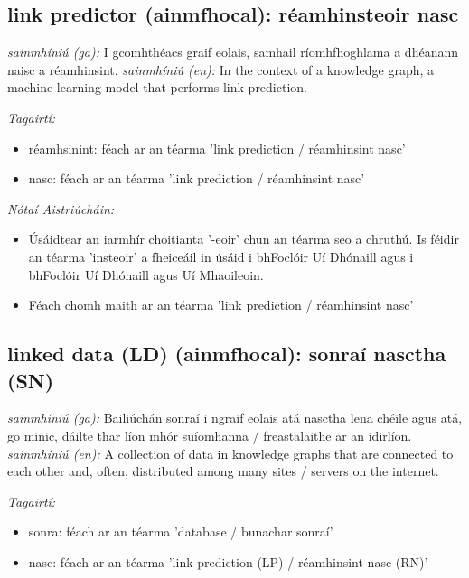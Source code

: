 \documentclass{article}
\begin{document}
\subsection*{link predictor (ainmfhocal): réamhinsteoir nasc} 
 \noindent \textit{sainmhíniú (ga):} I gcomhthéacs graif eolais, samhail ríomhfhoghlama a dhéanann naisc a réamhinsint.
\newline\newline
 \noindent \textit{sainmhíniú (en):} In the context of a knowledge graph, a machine learning model that performs link prediction.
\newline

 \noindent \textit{Tagairtí:}
\begin{itemize}
	\item réamhsinint: féach ar an téarma 'link prediction / réamhinsint nasc'
	\item nasc: féach ar an téarma 'link prediction / réamhinsint nasc'
\end{itemize}

 \noindent \textit{Nótaí Aistriúcháin:}
\begin{itemize}
	\item Úsáidtear an iarmhír choitianta '-eoir' chun an téarma seo a chruthú. Is féidir an téarma 'insteoir' a fheiceáil in úsáid i bhFoclóir Uí Dhónaill agus i bhFoclóir Uí Dhónaill agus Uí Mhaoileoin.
	\item Féach chomh maith ar an téarma 'link prediction / réamhinsint nasc'
\end{itemize}


\subsection*{linked data (LD) (ainmfhocal): sonraí nasctha (SN)} 
 \noindent \textit{sainmhíniú (ga):} Bailiúchán sonraí i ngraif eolais atá nasctha lena chéile agus atá, go minic, dáilte thar líon mhór suíomhanna / freastalaithe ar an idirlíon.
\newline\newline
 \noindent \textit{sainmhíniú (en):} A collection of data in knowledge graphs that are connected to each other and, often, distributed among many sites / servers on the internet.
\newline

 \noindent \textit{Tagairtí:}
\begin{itemize}
	\item sonra: féach ar an téarma 'database / bunachar sonraí'
	\item nasc: féach ar an téarma 'link prediction (LP) / réamhinsint nasc (RN)'
\end{itemize}
\end{document}
